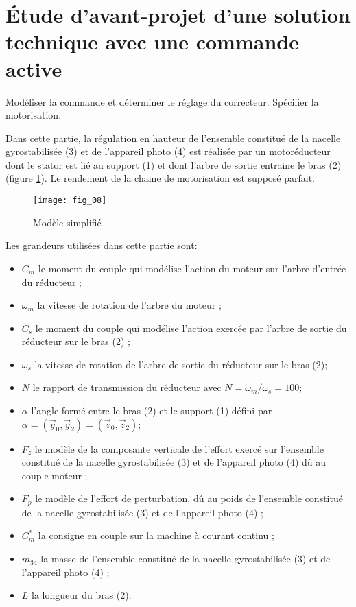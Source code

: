 \section{\label{part:4} Étude d'avant-projet d'une solution technique avec une commande active }


\begin{obj}
Modéliser la commande et déterminer le réglage du correcteur. Spécifier la motorisation.
\end{obj}

Dans cette partie, la régulation en hauteur de l'ensemble constitué de la nacelle gyrostabilisée (3) et de l'appareil photo (4) est réalisée par un motoréducteur dont le stator est lié au support (1) et dont l'arbre de sortie entraine le bras (2) (figure \ref{fig:08}). Le rendement de la chaine de motorisation est supposé parfait.

\begin{figure}[H]
\centering
\texttt{[image: fig\_08]}
\caption{\label{fig:08} Modèle simplifié}
\end{figure}

 Les grandeurs utilisées dans cette partie sont:

\begin{itemize}
  \item $C_{m}$ le moment du couple qui modélise l'action du moteur sur l'arbre d'entrée du réducteur ;
  \item $\omega_{m}$ la vitesse de rotation de l'arbre du moteur ;
  \item $C_{s}$ le moment du couple qui modélise l'action exercée par l'arbre de sortie du réducteur sur le bras (2) ;
  \item $\omega_{s}$ la vitesse de rotation de l'arbre de sortie du réducteur sur le bras (2);
  \item $N$ le rapport de transmission du réducteur avec $N=\omega_{m} / \omega_{s}=100$;
  \item $\alpha$ l'angle formé entre le bras (2) et le support (1) défini par $\alpha=\left(\vec{y}_{0}, \vec{y}_{2}\right)=\left(\vec{z}_{0}, \vec{z}_{2}\right)$;
  \item $F_{z}$ le modèle de la composante verticale de l'effort exercé sur l'ensemble constitué de la nacelle gyrostabilisée (3) et de l'appareil photo (4) dû au couple moteur ;
  \item $F_{p}$ le modèle de l'effort de perturbation, dû au poids de l'ensemble constitué de la nacelle gyrostabilisée (3) et de l'appareil photo (4) ;
  \item $C_{m}^{*}$ la consigne en couple sur la machine à courant continu ;
  \item $m_{34}$ la masse de l'ensemble constitué de la nacelle gyrostabilisée (3) et de l'appareil photo (4) ;
  \item $L$ la longueur du bras (2).
\end{itemize}

